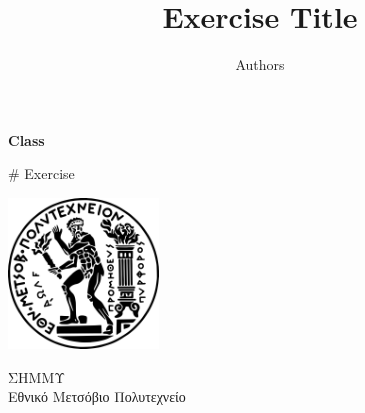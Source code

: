 \documentclass[12pt]{article}
\begin{document}
\author{Authors}


\title{Exercise Title}

\begin{titlepage}
    \begin{center}

        \Huge
        \textbf{Class}

        \vspace{0.5cm}
        \LARGE
        \# Exercise      

        \vspace{0.3cm}
        {\vspace{-2em}\let\newpage\relax\maketitle\vspace{-2em}}

        \vspace{0.8cm}

        \includegraphics[width=0.3\textwidth]{logo.png}

        \vspace{0.8cm}
        \Large
        ΣΗΜΜΥ\\
        Εθνικό Μετσόβιο Πολυτεχνείο\\

    \end{center}
\end{titlepage}

\tableofcontents
\setcounter{page}{2}
\pagebreak
\end{document}

